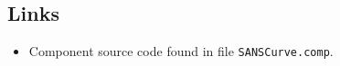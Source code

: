 \subsection*{Links}
\begin{itemize}
  \item Component source code found in file \texttt{SANSCurve.comp}.
\end{itemize}
